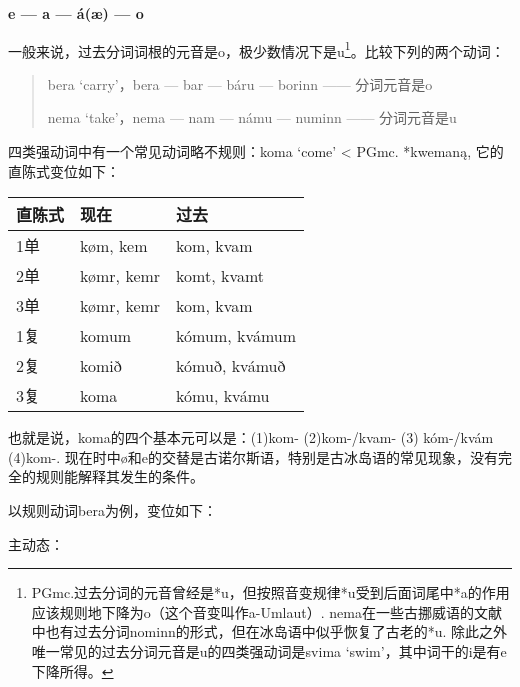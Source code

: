 \begin{center}
    \textbf{e --- a --- á(æ) --- o}
\end{center}


一般来说，过去分词词根的元音是o，极少数情况下是u\footnote{PGmc.过去分词的元音曾经是*u，但按照音变规律*u受到后面词尾中*a的作用应该规则地下降为o（这个音变叫作a-Umlaut）. nema在一些古挪威语的文献中也有过去分词nominn的形式，但在冰岛语中似乎恢复了古老的*u. 除此之外唯一常见的过去分词元音是u的四类强动词是svima `swim'，其中词干的i是有e下降所得。}。比较下列的两个动词：

\begin{quote}
    bera `carry‌'，bera --- bar --- báru --- borinn ------ 分词元音是o

    nema `take‌'，nema --- nam --- námu --- numinn ------ 分词元音是u
\end{quote}

四类强动词中有一个常见动词略不规则：koma `come' < PGmc.
*kwemaną, 它的直陈式变位如下：

\begin{longtable}{lll}
    \toprule
    直陈式 & 现在       & 过去          \\
    \midrule
    \endhead
    \bottomrule
    \endfoot
    1单    & køm, kem   & kom, kvam     \\
    2单    & kømr, kemr & komt, kvamt   \\
    3单    & kømr, kemr & kom, kvam     \\
    1复    & komum      & kómum, kvámum \\
    2复    & komið      & kómuð, kvámuð \\
    3复    & koma       & kómu, kvámu   \\
\end{longtable}

也就是说，koma的四个基本元可以是：(1)kom- (2)kom-/kvam- (3) kóm-/kvám (4)kom-. 现在时中ø和e的交替是古诺尔斯语，特别是古冰岛语的常见现象，没有完全的规则能解释其发生的条件。

以规则动词bera为例，变位如下：

主动态：

